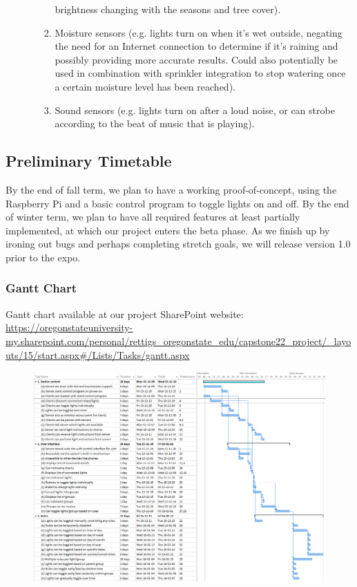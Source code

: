 \begin{enumerate}[resume]
\begin{enumerate}
\begin{enumerate}
                        brightness changing with the seasons and tree cover).
                    \item Moisture sensors (e.g. lights turn on when it's wet
                        outside, negating the need for an Internet connection
                        to determine if it's raining and possibly providing
                        more accurate results.  Could also potentially be used
                        in combination with sprinkler integration to stop
                        watering once a certain moisture level has been
                        reached).
                    \item Sound sensors (e.g. lights turn on after a loud
                        noise, or can strobe according to the beat of music
                        that is playing).
                \end{enumerate}
        \end{enumerate}
\end{enumerate}

\subsection{Preliminary Timetable}

By the end of fall term, we plan to have a working proof-of-concept, using the
Raspberry Pi and a basic control program to toggle lights on and off.  By the
end of winter term, we plan to have all required features at least partially
implemented, at which our project enters the beta phase.  As we finish up by
ironing out bugs and perhaps completing stretch goals, we will release version
1.0 prior to the expo.

\subsubsection{Gantt Chart}
Gantt chart available at our project SharePoint website:
\url{https://oregonstateuniversity-my.sharepoint.com/personal/rettigs_oregonstate_edu/capstone22_project/_layouts/15/start.aspx#/Lists/Tasks/gantt.aspx}
\begin{figure}
\includegraphics[width=1.0\textwidth]{ganttchart-original.png}
\end{figure}

\pagebreak

